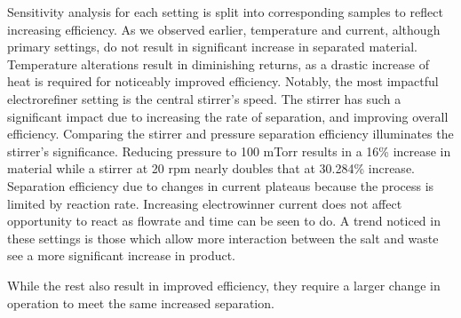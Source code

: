 Sensitivity analysis for each setting is split into corresponding samples to reflect increasing efficiency. As we observed earlier, temperature and current, although primary settings, 
do not result in significant increase in separated material. Temperature alterations result in diminishing returns, as a drastic increase of heat is required for noticeably improved efficiency. Notably,
the most impactful electrorefiner setting is the central stirrer's speed. The stirrer  
has such a significant impact due to increasing the rate of separation, and improving overall
efficiency. Comparing the stirrer and pressure separation efficiency illuminates the stirrer's significance. Reducing pressure to 100 mTorr results in a 16\% increase in material while a stirrer at 20 rpm nearly doubles that at 30.284\% increase.
Separation efficiency due to changes in current plateaus because the process is limited by reaction rate. Increasing electrowinner current does not affect opportunity to react as flowrate and time can be seen to do. 
A trend noticed in these settings is those which allow more interaction between the salt and waste see a more significant increase in product. 

While the rest also result in
improved efficiency, they require a larger change in operation to meet the same increased separation.